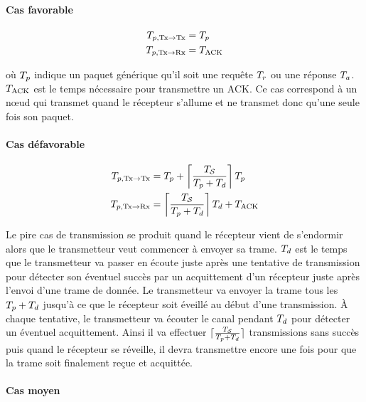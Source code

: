 \paragraph{Cas favorable}

\begin{align}
  T_{p, \textrm{Tx} \to \textrm{Tx}} &= T_p
  \label{contikimac:eq:pck_txtx_best} \\
  T_{p, \textrm{Tx} \to \textrm{Rx}} &= T_{\textrm{ACK}}
  \label{contikimac:eq:pck_txrx_best}
\end{align}

où $T_p$ indique un paquet générique qu'il soit une requête  $T_r$ ou une réponse $T_a$.
$T_{\textrm{ACK}}$ est le temps nécessaire pour transmettre un \ac{ACK}.
Ce cas correspond à un nœud qui transmet quand le récepteur s'allume et ne transmet donc qu'une seule fois son paquet.

\paragraph{Cas défavorable}

\begin{align}
  T_{p, \textrm{Tx} \to \textrm{Tx}} &= T_p + \left \lceil \frac{T_{\mathcal{S}}}{T_p + T_d}\right\rceil T_p
  \label{contikimac:eq:pck_txtx_worst} \\
  T_{p, \textrm{Tx} \to \textrm{Rx}} &= \left \lceil \frac{T_{\mathcal{S}}}{T_p + T_d}\right \rceil T_d + T_{\textrm{ACK}}
  \label{contikimac:eq:pck_txrx_worst}
\end{align}

Le pire cas de transmission se produit quand le récepteur vient de s'endormir alors que le transmetteur veut commencer à envoyer sa trame.
$T_d$ est le temps que le transmetteur va passer en écoute juste après une tentative de transmission pour détecter son éventuel succès par un acquittement d'un récepteur juste après l'envoi d'une trame de donnée.
Le transmetteur va envoyer la trame tous les $T_p + T_d$ jusqu'à ce que le récepteur soit éveillé au début d'une transmission.
À chaque tentative, le transmetteur va écouter le canal pendant $T_d$ pour détecter un éventuel acquittement.
Ainsi il va effectuer $\lceil \frac{T_{\mathcal{S}}}{T_p + T_d}\rceil$ transmissions sans succès puis quand le récepteur se réveille, il devra transmettre encore une fois pour que la trame soit  finalement reçue et acquittée.


\paragraph{Cas moyen}

